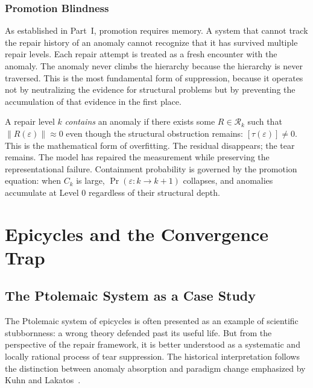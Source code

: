 \documentclass[12pt,oneside]{book}
\theoremstyle{plain}
\theoremstyle{definition}
\theoremstyle{remark}
\newcommand{\R}{\mathcal{R}}
\newcommand{\eps}{\varepsilon}
\newcommand{\norm}[1]{\left\lVert #1 \right\rVert}
\newcommand{\1}{\mathbf{1}}
\begin{document}
\subsection{Promotion Blindness}

As established in Part~I, promotion requires memory. A system that cannot track the repair history of an anomaly cannot recognize that it has survived multiple repair levels. Each repair attempt is treated as a fresh encounter with the anomaly. The anomaly never climbs the hierarchy because the hierarchy is never traversed. This is the most fundamental form of suppression, because it operates not by neutralizing the evidence for structural problems but by preventing the accumulation of that evidence in the first place.

\begin{derivbox}[frametitle={Derivation 4: Repair Containment and Overfitting}]
A repair level $k$ \emph{contains} an anomaly if there exists some $R \in \R_k$ such that $\norm{R(\eps)} \approx 0$ even though the structural obstruction remains: $[\tau(\eps)] \neq 0$. This is the mathematical form of overfitting. The residual disappears; the tear remains. The model has repaired the measurement while preserving the representational failure. Containment probability is governed by the promotion equation: when $C_k$ is large, $\Pr(\eps: k \to k+1)$ collapses, and anomalies accumulate at Level 0 regardless of their structural depth.
\end{derivbox}


\chapter{Epicycles and the Convergence Trap}

\section{The Ptolemaic System as a Case Study}

The Ptolemaic system of epicycles is often presented as an example of scientific stubbornness: a wrong theory defended past its useful life. But from the perspective of the repair framework, it is better understood as a systematic and locally rational process of tear suppression. The historical interpretation follows the distinction between anomaly absorption and paradigm change emphasized by Kuhn and Lakatos~\cite{kuhn1962,lakatos1978}.
\end{document}

